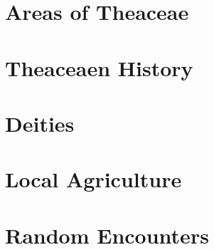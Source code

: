 

\begin{multicols}{2}

\section{Areas of Theaceae}


\section{Theaceaen History}


\section{Deities}


\section{Local Agriculture}


\section{Random Encounters}


\end{multicols}
